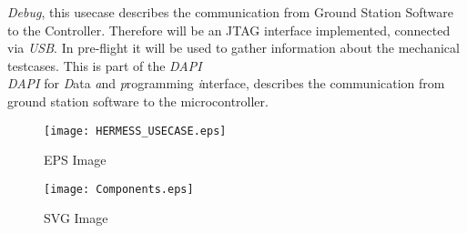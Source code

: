 \textit{Debug}, this usecase describes the communication from Ground Station Software to the Controller. Therefore will be an JTAG interface implemented, connected via \textit{USB}. In pre-flight it will be used to gather information about the mechanical testcases. This is part of the  \textit{DAPI}\\
\textit{DAPI} for \textit{D}ata \textit{a}nd \textit{p}rogramming  \textit{i}nterface, describes the communication from ground station software to the microcontroller. 
\begin{figure}[htbp]
	\centering
	  \texttt{[image: HERMESS\_USECASE.eps]}
	\caption{EPS Image}
\end{figure}
\begin{figure}[htbp]
	\centering
	\texttt{[image: Components.eps]}
	\caption{SVG Image}
\end{figure}
